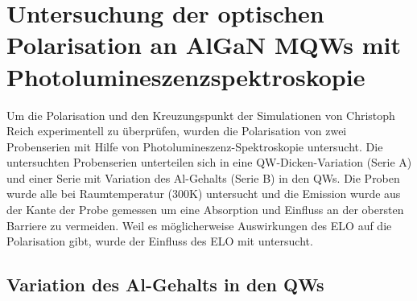 \thispagestyle{fancy}

\section{Untersuchung der optischen Polarisation an AlGaN MQWs mit Photolumineszenzspektroskopie}

Um die Polarisation und den Kreuzungspunkt der Simulationen von Christoph Reich experimentell zu \"uberpr\"ufen, wurden die Polarisation von zwei Probenserien mit Hilfe von Photolumineszenz-Spektroskopie untersucht. Die untersuchten Probenserien unterteilen sich in eine QW-Dicken-Variation (Serie A) und einer Serie mit Variation des Al-Gehalts (Serie B) in den QWs. 
Die Proben wurde alle bei Raumtemperatur (300K) untersucht und die Emission wurde aus der Kante der Probe gemessen um eine Absorption und Einfluss an der obersten Barriere zu vermeiden. Weil es m\"oglicherweise Auswirkungen des ELO auf die Polarisation gibt, wurde der Einfluss des ELO mit untersucht. 

\subsection{Variation des Al-Gehalts in den QWs}

